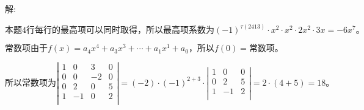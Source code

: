 \documentclass[lang=cn,10pt]{elegantbook}
\begin{document}
\noindent 解: 

\noindent$
\text{本题4行每行的最高项可以同时取得，所以最高项系数为}\left( -1 \right) ^{\tau \left( 2413 \right)}\cdot x^2\cdot x^2\cdot 2x^2\cdot 3x=-6x^7\text{。}
$

\noindent$
\text{常数项由于}f\left( x \right) =a_4x^4+a_3x^3+\cdots +a_1x^1+a_0\text{，所以}f\left( 0 \right) =\text{常数项。}
$

\noindent$
\text{所以常数项为}\left| \begin{matrix}
	1&		0&		3&		0\\
	0&		0&		-2&		0\\
	0&		2&		0&		5\\
	1&		-1&		0&		2\\
\end{matrix} \right|=\left( -2 \right) \cdot \left( -1 \right) ^{2+3}\cdot \left| \begin{matrix}
	1&		0&		0\\
	0&		2&		5\\
	1&		-1&		2\\
\end{matrix} \right|=2\cdot \left( 4+5 \right) =18\text{。}
$
\end{document}
